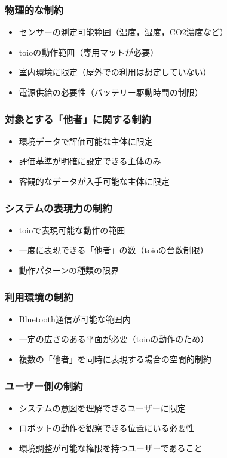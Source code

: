 \documentclass[paper=a4paper,jafontsize=9pt,head_space=15mm,gutter=20mm,
twocolumn,number_of_lines=49, line_length=26zw]{myuarticle}
\begin{document}
\subsubsection{物理的な制約}
\begin{itemize}
  \item センサーの測定可能範囲（温度，湿度，CO2濃度など）
  \item toioの動作範囲（専用マットが必要）
  \item 室内環境に限定（屋外での利用は想定していない）
  \item 電源供給の必要性（バッテリー駆動時間の制限）
\end{itemize}

\subsubsection{対象とする「他者」に関する制約}
\begin{itemize}
  \item 環境データで評価可能な主体に限定
  \item 評価基準が明確に設定できる主体のみ
  \item 客観的なデータが入手可能な主体に限定
\end{itemize}

\subsubsection{システムの表現力の制約}
\begin{itemize}
  \item toioで表現可能な動作の範囲
  \item 一度に表現できる「他者」の数（toioの台数制限）
  \item 動作パターンの種類の限界
\end{itemize}

\subsubsection{利用環境の制約}
\begin{itemize}
  \item Bluetooth通信が可能な範囲内
  \item 一定の広さのある平面が必要（toioの動作のため）
  \item 複数の「他者」を同時に表現する場合の空間的制約
\end{itemize}

\subsubsection{ユーザー側の制約}
\begin{itemize}
  \item システムの意図を理解できるユーザーに限定
  \item ロボットの動作を観察できる位置にいる必要性
  \item 環境調整が可能な権限を持つユーザーであること
\end{itemize}
\end{document}
